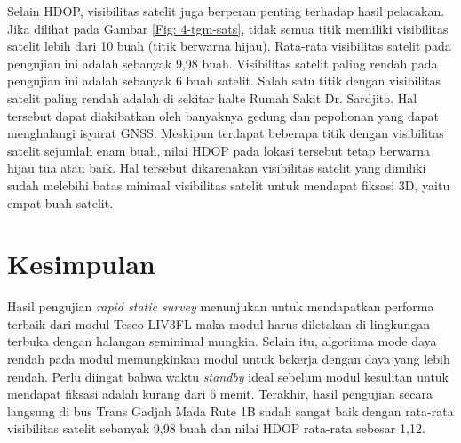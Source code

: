 \documentclass[conference]{IEEEtran}
\begin{document}
Selain HDOP, visibilitas satelit juga berperan penting terhadap hasil pelacakan. Jika dilihat pada Gambar \ref{Fig: 4-tgm-sats}, tidak semua titik memiliki visibilitas satelit lebih dari 10 buah (titik berwarna hijau). Rata-rata visibilitas satelit pada pengujian ini adalah sebanyak 9,98 buah. Visibilitas satelit paling rendah pada pengujian ini adalah sebanyak 6 buah satelit. Salah satu titik dengan visibilitas satelit paling rendah adalah di sekitar halte Rumah Sakit Dr. Sardjito. Hal tersebut dapat diakibatkan oleh banyaknya gedung dan pepohonan yang dapat menghalangi isyarat GNSS. Meskipun terdapat beberapa titik dengan visibilitas satelit sejumlah enam buah, nilai HDOP pada lokasi tersebut tetap berwarna hijau tua atau baik. Hal tersebut dikarenakan visibilitas satelit yang dimiliki sudah melebihi batas minimal visibilitas satelit untuk mendapat fiksasi 3D, yaitu empat buah satelit.

\section{Kesimpulan}
Hasil pengujian \textit{rapid static survey} menunjukan untuk mendapatkan performa terbaik dari modul Teseo-LIV3FL maka modul harus diletakan di lingkungan terbuka dengan halangan seminimal mungkin. Selain itu, algoritma mode daya rendah pada modul memungkinkan modul untuk bekerja dengan daya yang lebih rendah. Perlu diingat bahwa waktu \textit{standby} ideal sebelum modul kesulitan untuk mendapat fiksasi adalah kurang dari 6 menit. Terakhir, hasil pengujian secara langsung di bus Trans Gadjah Mada Rute 1B sudah sangat baik dengan rata-rata visibilitas satelit sebanyak 9,98 buah dan nilai HDOP rata-rata sebesar 1,12.

{}

\end{document}
